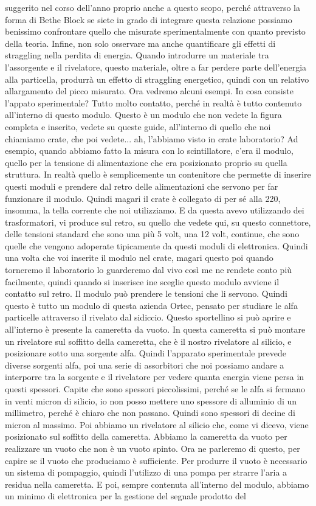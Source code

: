 suggerito nel corso dell'anno proprio anche a questo scopo, perché attraverso la forma di Bethe Block se siete in grado di integrare questa relazione possiamo benissimo confrontare quello che misurate sperimentalmente con quanto previsto della teoria. Infine, non solo osservare ma anche quantificare gli effetti di straggling nella perdita di energia. Quando introdurre un materiale tra l'assorgente e il rivelatore, questo materiale, oltre a far perdere parte dell'energia alla particella, produrrà un effetto di straggling energetico, quindi con un relativo allargamento del picco misurato. Ora vedremo alcuni esempi. In cosa consiste l'appato sperimentale? Tutto molto contatto, perché in realtà è tutto contenuto all'interno di questo modulo. Questo è un modulo che non vedete la figura completa e inserito, vedete su queste guide, all'interno di quello che noi chiamiamo crate, che poi vedete... ah, l'abbiamo visto in crate laboratorio? Ad esempio, quando abbiamo fatto la misura con lo scintillatore, c'era il modulo, quello per la tensione di alimentazione che era posizionato proprio su quella struttura. In realtà quello è semplicemente un contenitore che permette di inserire questi moduli e prendere dal retro delle alimentazioni che servono per far funzionare il modulo. Quindi magari il crate è collegato di per sé alla 220, insomma, la tella corrente che noi utilizziamo. E da questa avevo utilizzando dei trasformatori, vi produce sul retro, su quello che vedete qui, su questo connettore, delle tensioni standard che sono una più 5 volt, una 12 volt, continue, che sono quelle che vengono adoperate tipicamente da questi moduli di elettronica. Quindi una volta che voi inserite il modulo nel crate, magari questo poi quando torneremo il laboratorio lo guarderemo dal vivo così me ne rendete conto più facilmente, quindi quando si inserisce ine sceglie questo modulo avviene il contatto sul retro. Il modulo può prendere le tensioni che li servono. Quindi questo è tutto un modulo di questa azienda Ortec, pensato per studiare le alfa particelle attraverso il rivelato dal sidiccio. Questo sportellino si può aprire e all'interno è presente la cameretta da vuoto. In questa cameretta si può montare un rivelatore sul soffitto della cameretta, che è il nostro rivelatore al silicio, e posizionare sotto una sorgente alfa. Quindi l'apparato sperimentale prevede diverse sorgenti alfa, poi una serie di assorbitori che noi possiamo andare a interporre tra la sorgente e il rivelatore per vedere quanta energia viene persa in questi spessori. Capite che sono spessori piccolissimi, perché se le alfa si fermano in venti micron di silicio, io non posso mettere uno spessore di alluminio di un millimetro, perché è chiaro che non passano. Quindi sono spessori di decine di micron al massimo. Poi abbiamo un rivelatore al silicio che, come vi dicevo, viene posizionato sul soffitto della cameretta. Abbiamo la cameretta da vuoto per realizzare un vuoto che non è un vuoto spinto. Ora ne parleremo di questo, per capire se il vuoto che produciamo è sufficiente. Per produrre il vuoto è necessario un sistema di pompaggio, quindi l'utilizzo di una pompa per strarre l'aria a residua nella cameretta. E poi, sempre contenuta all'interno del modulo, abbiamo un minimo di elettronica per la gestione del segnale prodotto del 